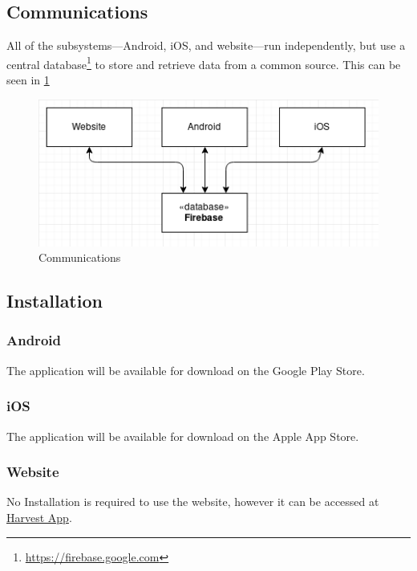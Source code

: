 \documentclass[11pt]{article}
\begin{document}
\subsection{Communications}
All of the subsystems---Android, iOS, and website---run independently, but use a central database\footnote{\url{https://firebase.google.com}} to store and retrieve data from a common source. This can be seen in \ref{Communications}

\begin{figure}
 \centering
 \includegraphics[width=12cm, keepaspectratio]{Images/webDiagramCommunications.png}
 \caption{Communications}
 \label{Communications}
\end{figure}

\subsection{Installation}
\subsubsection{Android}
The application will be available for download on the Google Play Store.
\subsubsection{iOS}
The application will be available for download on the Apple App Store.
\subsubsection{Website}
No Installation is required to use the website, however it can be accessed at \href{https://harvestapp.co.za}{Harvest App}.
\end{document}
